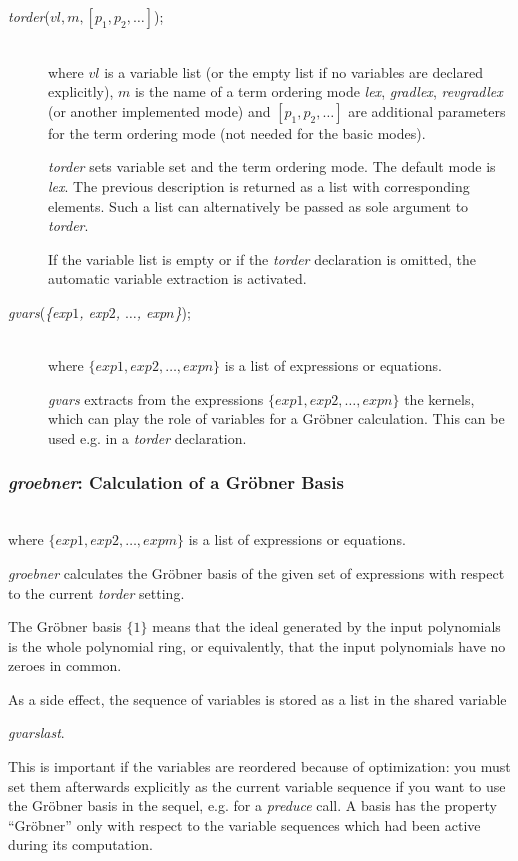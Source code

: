 \begin{description}
\item[{{\it torder}($vl,m,[p_1,p_2,\ldots]$);}]\mbox{}\\
where $vl$ is a variable list (or the empty list if
no variables are declared explicitly),
$m$ is the name of a term ordering mode \emph{lex}, \emph{gradlex},
\emph{revgradlex} (or another implemented mode) and
$[p_1,p_2,\ldots]$ are additional parameters for the
term ordering mode (not needed for the basic modes).

\emph{torder} sets variable set and the term ordering mode.
The default mode is \emph{lex}. The previous description is returned
as a list with corresponding elements. Such a list can
alternatively be passed as sole argument to \emph{torder}.

If the variable list is empty or if the \emph{torder} declaration
is omitted, the automatic variable extraction is activated.

\item[{\it gvars}({\it\{exp$1$, exp$2$, $\ldots$, exp$n$\}});]\mbox{}\\
where $\{exp1, exp2, \ldots , expn\}$ is a list of expressions or
equations.

\emph{gvars} extracts from the expressions $\{exp1, exp2, \ldots , expn\}$
the kernels, which can play the role of variables for a Gr\"obner
calculation. This can be used e.g. in a \emph{torder} declaration.
\end{description}

\subsubsection{\emph{groebner}: Calculation of a Gr\"obner Basis}
\begin{description}
\item[{\it groebner} $\{exp1, exp2, \ldots , expm\};$]\mbox{}\\
where $\{exp1, exp2, \ldots , expm\}$ is a list of
expressions or equations.

\emph{groebner} calculates the Gr\"obner basis of the given set of
expressions with respect to the current \emph{torder} setting.

The Gr\"obner basis $\{1\}$ means that the ideal generated by the
input polynomials is the whole polynomial ring, or equivalently, that
the input polynomials have no zeroes in common.

As a side effect, the sequence of variables is stored as a \REDUCE list
in the shared variable
\begin{center}
\emph{gvarslast}.
\end{center}

This is important if the variables are reordered because of optimization:
you must set them afterwards explicitly as the current variable sequence
if you want to use the Gr\"obner basis in the sequel, e.g. for a
\emph{preduce} call. A basis has the property ``Gr\"obner'' only with respect
to the variable sequences which had been active during its computation.
\end{description}

